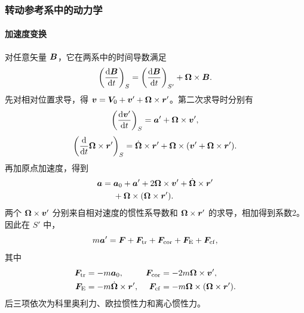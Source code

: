 \subsubsection{转动参考系中的动力学}
\paragraph{加速度变换}
对任意矢量 $\bm{B}$，它在两系中的时间导数满足
\[
\left(\frac{\mathop{}\!\mathrm d\bm{B}}{\mathop{}\!\mathrm d t}\right)_S
=\left(\frac{\mathop{}\!\mathrm d\bm{B}}{\mathop{}\!\mathrm d t}\right)_{S'}+\bm{\Omega}\times\bm{B}.
\]
先对相对位置求导，得 $\bm{v}=\bm{V}_0+\bm{v}'+\bm{\Omega}\times\bm{r}'$。第二次求导时分别有
\[
\left(\frac{\mathop{}\!\mathrm d\bm{v}'}{\mathop{}\!\mathrm d t}\right)_S=\bm{a}'+\bm{\Omega}\times\bm{v}',
\]
\[
\left(\frac{\mathop{}\!\mathrm d}{\mathop{}\!\mathrm d t}\bm{\Omega}\times\bm{r}'\right)_S
=\dot{\bm{\Omega}}\times\bm{r}'
+\bm{\Omega}\times(\bm{v}'+\bm{\Omega}\times\bm{r}').
\]
再加原点加速度，得到
\begin{equation}
\begin{aligned}
\bm{a}={}&\bm{a}_0+\bm{a}'
+2\bm{\Omega}\times\bm{v}'
+\dot{\bm{\Omega}}\times\bm{r}'\\
&+\bm{\Omega}\times(\bm{\Omega}\times\bm{r}').
\end{aligned}
\label{rot:eq:d6-acceleration}
\end{equation}
两个 $\bm{\Omega}\times\bm{v}'$ 分别来自相对速度的惯性系导数和 $\bm{\Omega}\times\bm{r}'$ 的求导，相加得到系数2。
因此在 $S'$ 中，
\begin{equation}
m\bm{a}'=\bm{F}+\bm{F}_{\rm tr}+\bm{F}_{\rm cor}
+\bm{F}_{\rm E}+\bm{F}_{\rm cf},
\end{equation}
其中
\[
\begin{aligned}
\bm{F}_{\rm tr}&=-m\bm{a}_0,&
\bm{F}_{\rm cor}&=-2m\bm{\Omega}\times\bm{v}',\\
\bm{F}_{\rm E}&=-m\dot{\bm{\Omega}}\times\bm{r}',&
\bm{F}_{\rm cf}&=-m\bm{\Omega}\times(\bm{\Omega}\times\bm{r}').
\end{aligned}
\]
后三项依次为科里奥利力、欧拉惯性力和离心惯性力。

